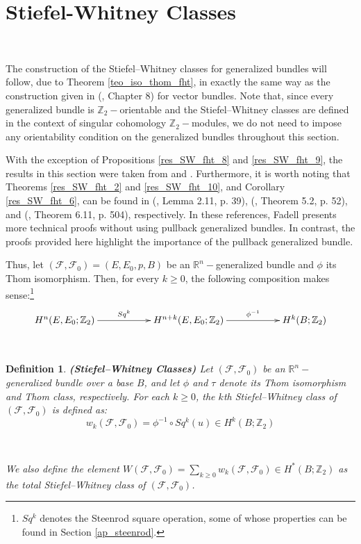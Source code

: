 \documentclass[12pt,oneside]{book}
\newtheorem{defi}   {Definition}[chapter]
\newcommand{\ds}{\displaystyle}
\newcommand{\R}{\mathbb{R}}
\newcommand{\Z}{\mathbb{Z}}
\begin{document}
    \section{Stiefel-Whitney Classes}\label{secao_SW}

    \

    The construction of the Stiefel–Whitney classes for generalized bundles will follow, due to Theorem 
    \ref{teo_iso_thom_fht}, in exactly the same way as the construction given in (\cite{milnor_1}, Chapter 8) for vector 
    bundles. Note that, since every generalized bundle is $\Z_{2}-$orientable and the Stiefel–Whitney classes are 
    defined in the context of singular cohomology $\Z_{2}-$modules, we do not need to impose any orientability condition on the generalized 
    bundles throughout this section.

    With the exception of Propositions \ref{res_SW_fht_8} and \ref{res_SW_fht_9}, the results in this section were taken from 
    \cite{fadell_1} and \cite{fadell_4}. Furthermore, it is worth noting that Theorems \ref{res_SW_fht_2} and \ref{res_SW_fht_10}, and 
    Corollary \ref{res_SW_fht_6}, can be found in (\cite{fadell_4}, Lemma 2.11, p. 39), (\cite{fadell_4}, Theorem 5.2, p. 52), and 
    (\cite{fadell_1}, Theorem 6.11, p. 504), respectively. In these references, Fadell presents more technical proofs without using pullback 
    generalized bundles. In contrast, the proofs provided here highlight the importance of the pullback generalized 
    bundle.

    Thus, let $(\mathcal{F},\mathcal{F}_{0})=(E,E_{0},p,B)$ be an $\R^{n}-$generalized bundle and $\phi$ its Thom isomorphism. Then, for 
    every $k\geq 0$, the following composition makes sense:\footnote{$Sq^{k}$ denotes the Steenrod square operation, 
    some of whose properties can be found in Section \ref{ap_steenrod}.}
    $$ \xymatrix @C=0.5cm {
    	H^{n}(E,E_{0};\Z_{2}) \ar[rrr]^-{Sq^{k}} &&& H^{n+k}(E,E_{0};\Z_{2}) \ar[rrr]^-{\phi^{-1}} &&& H^{k}(B;\Z_{2})
    } $$

    \

    \begin{defi}{\bf (Stiefel–Whitney Classes)}
    	Let $(\mathcal{F},\mathcal{F}_{0})$ be an $\R^{n}-$generalized bundle over a base $B$, and let $\phi$ and $\tau$ denote its Thom 
        isomorphism and Thom class, respectively. For each $k\geq 0$, the $k$th Stiefel–Whitney class of 
        $(\mathcal{F},\mathcal{F}_{0})$ is defined as:
    	$$ w_{k}(\mathcal{F},\mathcal{F}_{0}) = \phi^{-1} \circ Sq^{k}(u) \in H^{k}(B;\Z_{2}) $$

        \
    
    	We also define the element $W(\mathcal{F},\mathcal{F}_{0}) = \ds\sum_{k\geq 0} w_{k}(\mathcal{F},\mathcal{F}_{0}) \in H^{*}(B;\Z_{2})$ 
        as the total Stiefel–Whitney class of $(\mathcal{F},\mathcal{F}_{0})$.
    \end{defi}
\end{document}

